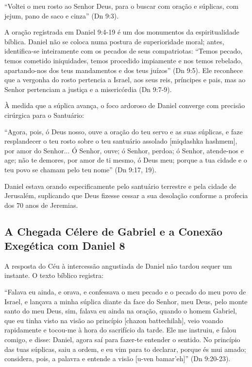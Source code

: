``Voltei o meu rosto ao Senhor Deus, para o buscar com oração e súplicas, com jejum, pano de saco e cinza'' (Dn 9:3).

A oração registrada em Daniel 9:4-19 é um dos monumentos da espiritualidade bíblica. Daniel não se coloca numa postura de superioridade moral; antes, identifica-se inteiramente com os pecados de seus compatriotas: ``Temos pecado, temos cometido iniquidades, temos procedido impiamente e nos temos rebelado, apartando-nos dos teus mandamentos e dos teus juízos'' (Dn 9:5). Ele reconhece que a vergonha do rosto pertencia a Israel, aos seus reis, príncipes e pais, mas ao Senhor pertenciam a justiça e a misericórdia (Dn 9:7-9).

À medida que a súplica avança, o foco ardoroso de Daniel converge com precisão cirúrgica para o Santuário:

``Agora, pois, ó Deus nosso, ouve a oração do teu servo e as suas súplicas, e faze resplandecer o teu rosto sobre o teu santuário assolado [miqdashka hashmem], por amor do Senhor... Ó Senhor, ouve; ó Senhor, perdoa; ó Senhor, atende-nos e age; não te demores, por amor de ti mesmo, ó Deus meu; porque a tua cidade e o teu povo se chamam pelo teu nome'' (Dn 9:17, 19).

Daniel estava orando especificamente pelo santuário terrestre e pela cidade de Jerusalém, suplicando que Deus fizesse cessar a sua desolação conforme a profecia dos 70 anos de Jeremias.



\subsection{A Chegada Célere de Gabriel e a Conexão Exegética com Daniel 8}


A resposta do Céu à intercessão angustiada de Daniel não tardou sequer um instante. O texto bíblico registra:

``Falava eu ainda, e orava, e confessava o meu pecado e o pecado do meu povo de Israel, e lançava a minha súplica diante da face do Senhor, meu Deus, pelo monte santo do meu Deus, sim, falava eu ainda na oração, quando o homem Gabriel, que eu tinha visto na visão ao princípio [chazon battechilah], veio voando rapidamente e tocou-me à hora do sacrifício da tarde. Ele me instruiu, e falou comigo, e disse: Daniel, agora saí para fazer-te entender o sentido. No princípio das tuas súplicas, saiu a ordem, e eu vim para to declarar, porque és mui amado; considera, pois, a palavra e entende a visão [u-ven bamar'eh]'' (Dn 9:20-23).

